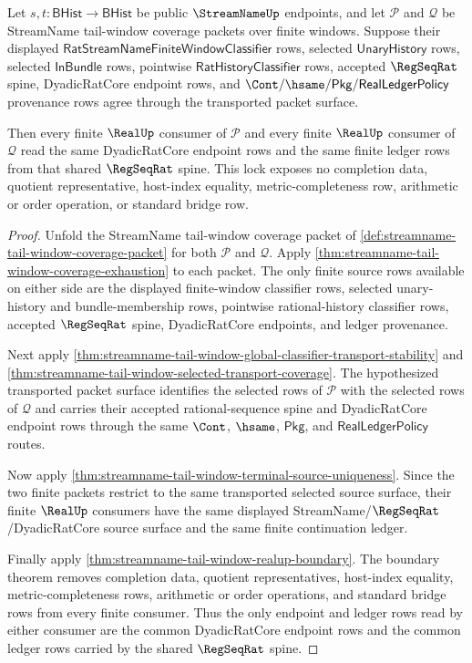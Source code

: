 \begin{theorem}
\label{thm:streamname-tail-window-regseqrat-coverage-lock}
Let $s,t:\mathsf{BHist}\to\mathsf{BHist}$ be public $\StreamNameUp$
endpoints, and let $\mathcal P$ and $\mathcal Q$ be StreamName tail-window
coverage packets over finite windows. Suppose their displayed
$\mathsf{RatStreamNameFiniteWindowClassifier}$ rows, selected
$\mathsf{UnaryHistory}$ rows, selected $\mathsf{InBundle}$ rows, pointwise
$\mathsf{RatHistoryClassifier}$ rows, accepted $\RegSeqRat$ spine,
DyadicRatCore endpoint rows, and $\Cont/\hsame/\mathsf{Pkg}/
\mathsf{RealLedgerPolicy}$ provenance rows agree through the transported
packet surface.

Then every finite $\RealUp$ consumer of $\mathcal P$ and every finite
$\RealUp$ consumer of $\mathcal Q$ read the same DyadicRatCore endpoint rows
and the same finite ledger rows from that shared $\RegSeqRat$ spine. This
lock exposes no completion data, quotient representative, host-index
equality, metric-completeness row, arithmetic or order operation, or standard
bridge row.
\end{theorem}
\begin{proof}
Unfold the StreamName tail-window coverage packet of
\autoref{def:streamname-tail-window-coverage-packet} for both
$\mathcal P$ and $\mathcal Q$. Apply
\autoref{thm:streamname-tail-window-coverage-exhaustion} to each packet. The
only finite source rows available on either side are the displayed
finite-window classifier rows, selected unary-history and bundle-membership
rows, pointwise rational-history classifier rows, accepted $\RegSeqRat$
spine, DyadicRatCore endpoints, and ledger provenance.

Next apply
\autoref{thm:streamname-tail-window-global-classifier-transport-stability}
and \autoref{thm:streamname-tail-window-selected-transport-coverage}. The
hypothesized transported packet surface identifies the selected rows of
$\mathcal P$ with the selected rows of $\mathcal Q$ and carries their
accepted rational-sequence spine and DyadicRatCore endpoint rows through the
same $\Cont$, $\hsame$, $\mathsf{Pkg}$, and
$\mathsf{RealLedgerPolicy}$ routes.

Now apply
\autoref{thm:streamname-tail-window-terminal-source-uniqueness}. Since the
two finite packets restrict to the same transported selected source surface,
their finite $\RealUp$ consumers have the same displayed
StreamName/$\RegSeqRat$/DyadicRatCore source surface and the same finite
continuation ledger.

Finally apply \autoref{thm:streamname-tail-window-realup-boundary}. The
boundary theorem removes completion data, quotient representatives,
host-index equality, metric-completeness rows, arithmetic or order
operations, and standard bridge rows from every finite consumer. Thus the
only endpoint and ledger rows read by either consumer are the common
DyadicRatCore endpoint rows and the common ledger rows carried by the shared
$\RegSeqRat$ spine.
\end{proof}

